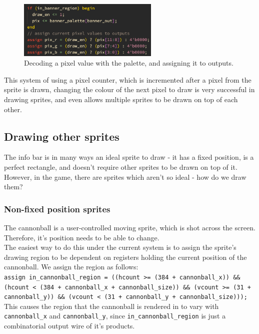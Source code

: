 \documentclass{ifda}
\begin{document}
\begin{figure}[h]
    \centering
    \includegraphics[width=0.6\textwidth]{ inreg }
    \caption{Decoding a pixel value with the palette, and assigning it to outputs.}
    \label{fig:sync_assignment}
\end{figure}

This system of using a pixel counter, which is incremented after a pixel from the sprite is drawn, changing the colour of the next pixel to draw is very successful in drawing sprites, and even allows multiple sprites to be drawn on top of each other.\\

\subsection{Drawing other sprites} %
The info bar is in many ways an ideal sprite to draw - it has a fixed position, is a perfect rectangle, and doesn't require other sprites to be drawn on top of it. However, in the game, there are sprites which aren't so ideal - how do we draw them?\\

\subsubsection{Non-fixed position sprites}
The cannonball is a user-controlled moving sprite, which is shot across the screen. Therefore, it's position needs to be able to change.\\
The easiest way to do this under the current system is to assign the sprite's drawing region to be dependent on registers holding the current position of the cannonball. We assign the region as follows:\\
\verb|assign in_cannonball_region = ((hcount >= (384 + cannonball_x)) &&|\\ \verb|(hcount < (384 + cannonball_x + cannonball_size)) && (vcount >= (31 +|\\ \verb|cannonball_y)) && (vcount < (31 + cannonball_y + cannonball_size)));|\\

This causes the region that the cannonball is rendered in to vary with \verb|cannonball_x| and \verb|cannonball_y|, since \verb|in_cannonball_region| is just a combinatorial output wire of it's products.\\
\end{document}
